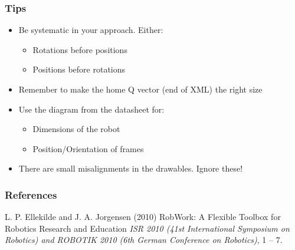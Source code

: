 \documentclass{beamer}
\begin{document}

\begin{frame}
  \frametitle{Tips}
  \begin{itemize}
  \item Be systematic in your approach. Either: 
    \begin{itemize}
    \item Rotations before positions
    \item Positions before rotations
    \end{itemize}
  \item Remember to make the home Q vector (end of XML) the right size
  \item Use the diagram from the datasheet for:
    \begin{itemize}
    \item Dimensions of the robot
    \item Position/Orientation of frames
    \end{itemize}
  \item { \color{red} There are small misalignments in the drawables. Ignore these! }
  \end{itemize}
\end{frame}

\begin{frame}
\frametitle{References}
\footnotesize{
\begin{thebibliography}{99} %
 L. P. Ellekilde and J. A. Jorgensen (2010)
\newblock RobWork: A Flexible Toolbox for Robotics Research and Education
\newblock \emph{ISR 2010 (41st International Symposium on Robotics) and ROBOTIK 2010 (6th German Conference on Robotics)}, 1 -- 7.
\end{thebibliography}
}
\end{frame}

\end{document}
